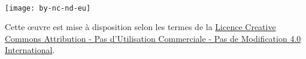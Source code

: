 ~\vfill
\begin{center}
	\begin{minipage}[c]{0.25\linewidth}
		\texttt{[image: by-nc-nd-eu]}
	\end{minipage}\hfill
\end{center}

Cette \oe{}uvre est mise à disposition selon les termes de la \href{https://creativecommons.org/licenses/by-nc-nd/4.0/deed.fr}{Licence Creative Commons Attribution - Pas d’Utilisation Commerciale - Pas de Modification 4.0 International}. %
